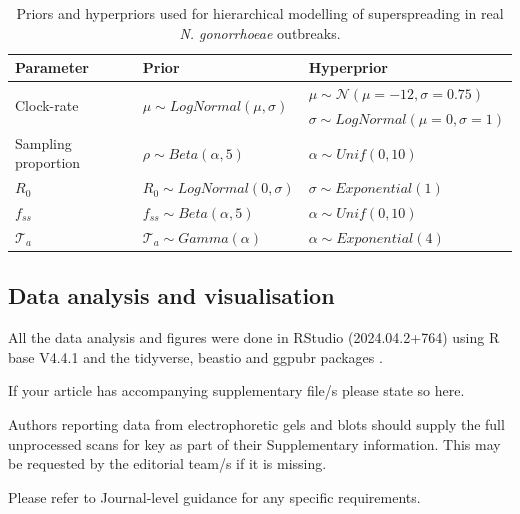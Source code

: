 \documentclass[lineno,pdflatex,sn-nature]{sn-jnl}%
\theoremstyle{thmstyleone}%
\theoremstyle{thmstyletwo}%
\theoremstyle{thmstylethree}%
\begin{document}
\begin{table}
    \centering
    \caption{Priors and hyperpriors used for hierarchical modelling of superspreading in real \textit{N. gonorrhoeae} outbreaks.}
    \begin{tabular}{l|l|l}
    \hline
      \textbf{Parameter}   &  \textbf{Prior} & \textbf{Hyperprior}\\
      \hline
       \multirow{2}{5em}{Clock-rate}  & \multirow{2}{12em}{$\mu \sim LogNormal(\mu, \sigma)$} &  $\mu \sim \mathcal{N}(\mu = -12, \sigma = 0.75 )$ \\
       & &  $\sigma \sim LogNormal(\mu = 0, \sigma = 1)$\\
      \hline
       \multirow{1}{10em}{Sampling proportion}  & \multirow{1}{12em}{$\rho \sim Beta(\alpha, 5)$} &  $\alpha \sim Unif(0,10)$  \\
       \hline
       \multirow{1}{5em}{$R_{0}$}  &  \multirow{1}{12em}{$R_{0} \sim LogNormal(0, \sigma)$} &  $\sigma \sim Exponential(1)$  \\
       \hline
        \multirow{1}{5em}{$f_{ss}$}  & \multirow{1}{12em}{$f_{ss} \sim Beta(\alpha, 5)$} &  $\alpha \sim Unif(0,10)$  \\
       \hline
       \multirow{1}{5em}{$\mathcal{T}_a$}  &  \multirow{1}{12em}{$\mathcal{T}_a \sim Gamma(\alpha)$} &  $\alpha \sim Exponential(4)$ \\
    \end{tabular}
    \label{tab-priors}
\end{table}

\subsection{Data analysis and visualisation}

All the data analysis and figures were done in RStudio (2024.04.2+764) using R base V4.4.1 \cite{Rbase} and the tidyverse, beastio and ggpubr packages \cite{tidyverse, beastio, ggpubr}.

\backmatter


If your article has accompanying supplementary file/s please state so here. 

Authors reporting data from electrophoretic gels and blots should supply the full unprocessed scans for key as part of their Supplementary information. This may be requested by the editorial team/s if it is missing.

Please refer to Journal-level guidance for any specific requirements.
\end{document}

